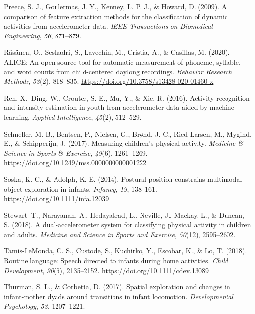 \documentclass[
  man]{apa6}
\newlength{\cslhangindent}
\newlength{\cslentryspacingunit} %
\newenvironment{CSLReferences}[2] %
 {%
  \setlength{\parindent}{0pt}
  \ifodd #1
  \let\oldpar\par
  \def\par{\hangindent=\cslhangindent\oldpar}
  \fi
  \setlength{\parskip}{#2\cslentryspacingunit}
 }%
 {}
\begin{document}
\begin{CSLReferences}{1}{0}
\leavevmode{}%
Preece, S. J., Goulermas, J. Y., Kenney, L. P. J., \& Howard, D. (2009). A comparison of feature extraction methods for the classification of dynamic activities from accelerometer data. \emph{IEEE Transactions on Biomedical Engineering}, \emph{56}, 871--879.

\leavevmode{}%
Räsänen, O., Seshadri, S., Lavechin, M., Cristia, A., \& Casillas, M. (2020). {ALICE}: An open-source tool for automatic measurement of phoneme, syllable, and word counts from child-centered daylong recordings. \emph{Behavior Research Methods}, \emph{53}(2), 818--835. \url{https://doi.org/10.3758/s13428-020-01460-x}

\leavevmode{}%
Ren, X., Ding, W., Crouter, S. E., Mu, Y., \& Xie, R. (2016). Activity recognition and intensity estimation in youth from accelerometer data aided by machine learning. \emph{Applied Intelligence}, \emph{45}(2), 512--529.

\leavevmode{}%
Schneller, M. B., Bentsen, P., Nielsen, G., Brønd, J. C., Ried-Larsen, M., Mygind, E., \& Schipperijn, J. (2017). Measuring children's physical activity. \emph{Medicine \& Science in Sports \& Exercise}, \emph{49}(6), 1261--1269. \url{https://doi.org/10.1249/mss.0000000000001222}

\leavevmode{}%
Soska, K. C., \& Adolph, K. E. (2014). Postural position constrains multimodal object exploration in infants. \emph{Infancy}, \emph{19}, 138--161. \url{https://doi.org/10.1111/infa.12039}

\leavevmode{}%
Stewart, T., Narayanan, A., Hedayatrad, L., Neville, J., Mackay, L., \& Duncan, S. (2018). A dual-accelerometer system for classifying physical activity in children and adults. \emph{Medicine and Science in Sports and Exercise}, \emph{50}(12), 2595--2602.

\leavevmode{}%
Tamis-LeMonda, C. S., Custode, S., Kuchirko, Y., Escobar, K., \& Lo, T. (2018). Routine language: Speech directed to infants during home activities. \emph{Child Development}, \emph{90}(6), 2135--2152. \url{https://doi.org/10.1111/cdev.13089}

\leavevmode{}%
Thurman, S. L., \& Corbetta, D. (2017). Spatial exploration and changes in infant-mother dyads around transitions in infant locomotion. \emph{Developmental Psychology}, \emph{53}, 1207--1221.


\end{CSLReferences}
\end{document}
